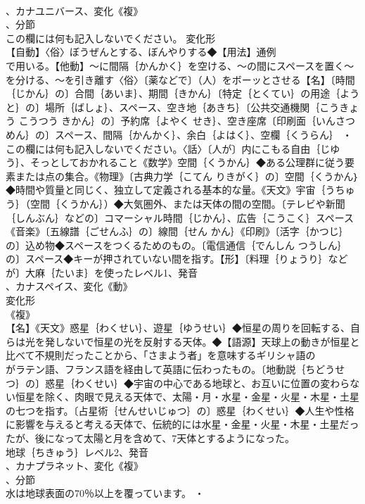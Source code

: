 \documentclass[8pt]{extreport}
\begin{document}
\begin{CJK}{UTF8}{min}
\\	、カナユニバース、変化《複》
\\	、分節
\\	この欄には何も記入しないでください。	変化形 
\\	【自動】〈俗〉ぼうぜんとする、ぼんやりする◆【用法】通例
\\	で用いる。【他動】～に間隔｛かんかく｝を空ける、～の間にスペースを置く～を分ける、～を引き離す〈俗〉〔薬などで〕（人）をボーッとさせる【名】〔時間｛じかん｝の〕合間｛あいま｝、期間｛きかん｝〔特定｛とくてい｝の用途｛ようと｝の〕場所｛ばしょ｝、スペース、空き地｛あきち｝〔公共交通機関｛こうきょう こうつう きかん｝の〕予約席｛よやく せき｝、空き座席〔印刷面｛いんさつ めん｝の〕スペース、間隔｛かんかく｝、余白｛よはく｝、空欄｛くうらん｝ ・
\\	この欄には何も記入しないでください。〈話〉〔人が〕内にこもる自由｛じゆう｝、そっとしておかれること《数学》空間｛くうかん｝◆ある公理群に従う要素または点の集合。《物理》〔古典力学｛こてん りきがく｝の〕空間｛くうかん｝◆時間や質量と同じく、独立して定義される基本的な量。《天文》宇宙｛うちゅう｝（空間｛くうかん｝）◆大気圏外、または天体の間の空間。〔テレビや新聞｛しんぶん｝などの〕コマーシャル時間｛じかん｝、広告｛こうこく｝スペース《音楽》〔五線譜｛ごせんふ｝の〕線間｛せん かん｝《印刷》〔活字｛かつじ｝の〕込め物◆スペースをつくるためのもの。〔電信通信｛でんしん つうしん｝の〕スペース◆キーが押されていない間を指す。【形】〔料理｛りょうり｝などが〕大麻｛たいま｝を使ったレベル1、発音
\\	、カナスペイス、変化《動》
\\	変化形 
\\	《複》
\\	【名】《天文》惑星｛わくせい｝、遊星｛ゆうせい｝◆恒星の周りを回転する、自らは光を発しないで恒星の光を反射する天体。◆【語源】天球上の動きが恒星と比べて不規則だったことから、「さまよう者」を意味するギリシャ語の
\\	がラテン語、フランス語を経由して英語に伝わったもの。〔地動説｛ちどうせつ｝の〕惑星｛わくせい｝◆宇宙の中心である地球と、お互いに位置の変わらない恒星を除く、肉眼で見える天体で、太陽・月・水星・金星・火星・木星・土星の七つを指す。〔占星術｛せんせいじゅつ｝の〕惑星｛わくせい｝◆人生や性格に影響を与えると考える天体で、伝統的には水星・金星・火星・木星・土星だったが、後になって太陽と月を含めて、7天体とするようになった。
\\	地球｛ちきゅう｝レベル2、発音
\\	、カナプラネット、変化《複》
\\	、分節
\\	水は地球表面の70％以上を覆っています。 ・

\end{CJK}
\end{document}

